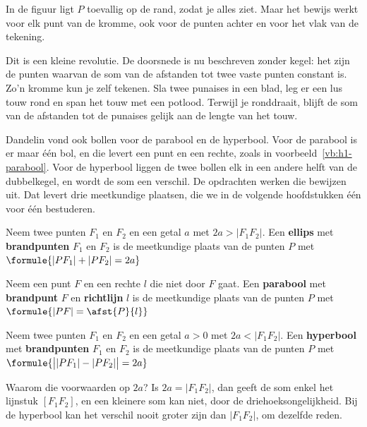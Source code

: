 In de figuur ligt $P$ toevallig op de rand, zodat je alles ziet. Maar het bewijs werkt voor elk punt van de kromme, ook voor de punten achter en voor het vlak van de tekening.

Dit is een kleine revolutie. De doorsnede is nu beschreven zonder kegel: het zijn de punten waarvan de som van de afstanden tot twee vaste punten constant is. Zo'n kromme kun je zelf tekenen. Sla twee punaises in een blad, leg er een lus touw rond en span het touw met een potlood. Terwijl je ronddraait, blijft de som van de afstanden tot de punaises gelijk aan de lengte van het touw.

Dandelin vond ook bollen voor de parabool en de hyperbool. Voor de parabool is er maar één bol, en die levert een punt en een rechte, zoals in voorbeeld~\ref{vb:h1-parabool}. Voor de hyperbool liggen de twee bollen elk in een andere helft van de dubbelkegel, en wordt de som een verschil. De opdrachten werken die bewijzen uit. Dat levert drie meetkundige plaatsen, die we in de volgende hoofdstukken één voor één bestuderen.

\begin{theorie}
Neem twee punten $F_1$ en $F_2$ en een getal $a$ met $2a > |F_1F_2|$. Een \textbf{\textcolor{accent}{ellips}} met \textbf{\textcolor{accent}{brandpunten}} $F_1$ en $F_2$ is de meetkundige plaats van de punten $P$ met \quad $\formule{|PF_1| + |PF_2| = 2a}$
\end{theorie}

\begin{theorie}
Neem een punt $F$ en een rechte $l$ die niet door $F$ gaat. Een \textbf{\textcolor{accent}{parabool}} met \textbf{\textcolor{accent}{brandpunt}} $F$ en \textbf{\textcolor{accent}{richtlijn}} $l$ is de meetkundige plaats van de punten $P$ met \quad $\formule{|PF| = \afst{P}{l}}$
\end{theorie}

\begin{theorie}
Neem twee punten $F_1$ en $F_2$ en een getal $a > 0$ met $2a < |F_1F_2|$. Een \textbf{\textcolor{accent}{hyperbool}} met \textbf{\textcolor{accent}{brandpunten}} $F_1$ en $F_2$ is de meetkundige plaats van de punten $P$ met \quad $\formule{\bigl||PF_1| - |PF_2|\bigr| = 2a}$
\end{theorie}

Waarom die voorwaarden op $2a$? Is $2a = |F_1F_2|$, dan geeft de som enkel het lijnstuk $[F_1F_2]$, en een kleinere som kan niet, door de driehoeksongelijkheid. Bij de hyperbool kan het verschil nooit groter zijn dan $|F_1F_2|$, om dezelfde reden.

